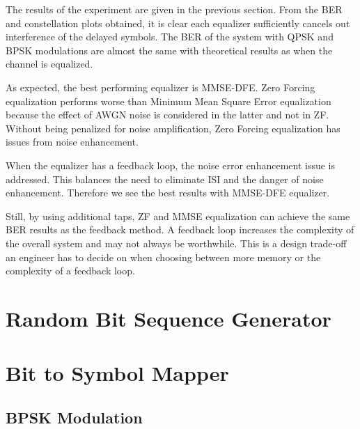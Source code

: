 \documentclass[]{article}
\begin{document}
The results of the experiment are given in the previous section. From the BER and constellation plots obtained, it is clear each equalizer sufficiently cancels out interference of the delayed symbols. The BER of the system with QPSK and BPSK modulations are almost the same with theoretical results as when the channel is equalized. 

As expected, the best performing equalizer is MMSE-DFE.  Zero Forcing equalization performs worse than Minimum Mean Square Error equalization because the effect of AWGN noise is considered in the latter and not in ZF.  Without being penalized for noise amplification, Zero Forcing equalization has issues from noise enhancement. 

When the equalizer has a feedback loop, the noise error enhancement issue is addressed. This balances the need to eliminate ISI and the danger of noise enhancement. Therefore we see the best results with MMSE-DFE equalizer.

Still, by using additional taps, ZF and MMSE equalization can achieve the same BER results as the feedback method.  A feedback loop increases the complexity of the overall system and may not always be worthwhile. This is a design trade-off an engineer has to decide on when choosing between more memory or the complexity of a feedback loop.

\appendix
\newpage


\newpage
%

\section{Random Bit Sequence Generator}
\label{app:random_bit_generator}


\section{Bit to Symbol Mapper}
\label{app:bittosym}
\subsection{BPSK Modulation}
\label{app:bpsk_mod}

\end{document}
